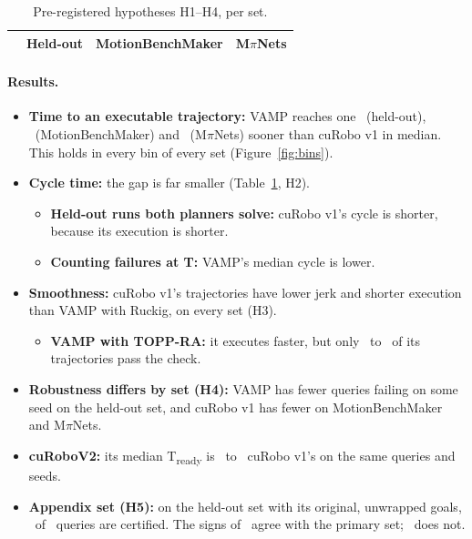 \documentclass[11pt]{article}
\begin{document}
\begin{table}[ht]\centering\footnotesize
\caption{Pre-registered hypotheses H1--H4, per set.}\label{tab:hyp}
\begin{tabular}{@{}p{6.2cm} ccc@{}}\toprule
 & Held-out & MotionBenchMaker & M$\pi$Nets \\\midrule
\end{tabular}
\end{table}

\paragraph{Results.}
\begin{itemize}
  \item \textbf{Time to an executable trajectory:} VAMP reaches one \readyRatioA\ (held-out), \readyRatioMbm\ (MotionBenchMaker) and \readyRatioMpi\ (M$\pi$Nets) sooner than cuRobo v1 in median. This holds in every bin of every set (Figure~\ref{fig:bins}).
  \item \textbf{Cycle time:} the gap is far smaller (Table~\ref{tab:hyp}, H2).
  \begin{itemize}
    \item \textbf{Held-out runs both planners solve:} cuRobo v1's cycle is shorter, because its execution is shorter.
    \item \textbf{Counting failures at T:} VAMP's median cycle is lower.
  \end{itemize}
  \item \textbf{Smoothness:} cuRobo v1's trajectories have lower jerk and shorter execution than VAMP with Ruckig, on every set (H3).
  \begin{itemize}
    \item \textbf{VAMP with TOPP-RA:} it executes faster, but only \toppraValidMin\ to \toppraValidMax\ of its trajectories pass the check.
  \end{itemize}
  \item \textbf{Robustness differs by set (H4):} VAMP has fewer queries failing on some seed on the held-out set, and cuRobo v1 has fewer on MotionBenchMaker and M$\pi$Nets.
  \item \textbf{cuRoboV2:} its median T\textsubscript{ready} is \vTwoOverVOneMin\ to \vTwoOverVOneMax\ cuRobo v1's on the same queries and seeds.
  \item \textbf{Appendix set (H5):} on the held-out set with its original, unwrapped goals, \feasOrig\ of \feasQOrig\ queries are certified. The signs of \hFiveHolds\ agree with the primary set; \hFiveFails\ does not.
\end{itemize}
\end{document}
